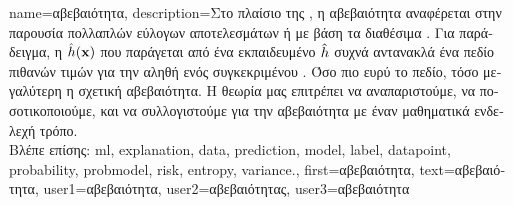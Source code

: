 
{name={\foreignlanguage{greek}{αβεβαιότητα}},
	description={\foreignlanguage{greek}{Στο πλαίσιο της} , 
		\foreignlanguage{greek}{η αβεβαιότητα αναφέρεται στην παρουσία πολλαπλών εύλογων αποτελεσμάτων ή}
		 \foreignlanguage{greek}{με βάση τα διαθέσιμα} . 
		\foreignlanguage{greek}{Για παράδειγμα, η}  $\hat{h}({\bf x})$ 
		\foreignlanguage{greek}{που παράγεται από ένα εκπαιδευμένο}   $\hat{h}$
	 	\foreignlanguage{greek}{συχνά αντανακλά ένα πεδίο πιθανών τιμών για την αληθή}  
		\foreignlanguage{greek}{ενός συγκεκριμένου} . \foreignlanguage{greek}{Όσο πιο ευρύ το 
		πεδίο, τόσο μεγαλύτερη η σχετική αβεβαιότητα. Η θεωρία}  \foreignlanguage{greek}{μας 
		επιτρέπει να αναπαριστούμε, να ποσοτικοποιούμε, και να συλλογιστούμε για την αβεβαιότητα με έναν 
		μαθηματικά ενδελεχή τρόπο.} \\
		\foreignlanguage{greek}{Βλέπε επίσης:} \gls{ml}, \gls{explanation}, \gls{data}, \gls{prediction}, \gls{model}, \gls{label}, 
		\gls{datapoint}, \gls{probability}, \gls{probmodel}, \gls{risk}, \gls{entropy}, \gls{variance}.},
	first={\foreignlanguage{greek}{αβεβαιότητα}},
	text={\foreignlanguage{greek}{αβεβαιότητα}},
	user1={\foreignlanguage{greek}{αβεβαιότητα}}, %
  	user2={\foreignlanguage{greek}{αβεβαιότητας}}, %
	user3={\foreignlanguage{greek}{αβεβαιότητα}} %
}


